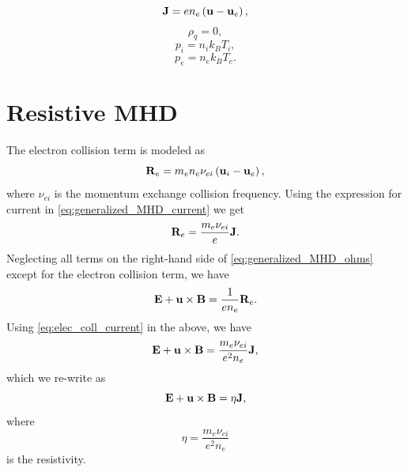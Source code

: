 \documentclass[a4paper,11pt]{report}
\begin{document}
\begin{equation}
    \label{eq:generalized_MHD_current}
    \mathbf{J} = e n_e \left(\mathbf{u} - \mathbf{u}_e \right),
\end{equation}
\begin{equation}
    \label{eq:generalized_MHD_charge}
    \rho_q = 0,
\end{equation}
\begin{equation}
    \label{eq:generalized_MHD_ion_eos}
    p_i = n_i k_B T_i,
\end{equation}
\begin{equation}
    \label{eq:generalized_MHD_elec_eos}
    p_e = n_e k_B T_e.
\end{equation}

\section{Resistive MHD}
The electron collision term is modeled as
\begin{equation}
    \mathbf{R}_e = m_e n_e \nu_{ei} \left ( \mathbf{u}_i - \mathbf{u}_e \right ),
\end{equation}
where $\nu_{ei}$ is the momentum exchange collision frequency. Using the expression for current in \cref{eq:generalized_MHD_current} we get
\begin{equation}
\label{eq:elec_coll_current}
    \mathbf{R}_e = \frac{m_e \nu_{ei}}{e} \mathbf{J}.
\end{equation}
Neglecting all terms on the right-hand side of \cref{eq:generalized_MHD_ohms} except for the electron collision term, we have
\begin{equation}
    \mathbf{E} + \mathbf{u} \times \mathbf{B} = \frac{1}{e n_e} \mathbf{R}_e.
\end{equation}
Using \cref{eq:elec_coll_current} in the above, we have
\begin{equation}
    \mathbf{E} + \mathbf{u} \times \mathbf{B} = \frac{m_e \nu_{ei}}{e^2 n_e} \mathbf{J},
\end{equation}
which we re-write as 
\begin{equation}
    \mathbf{E} + \mathbf{u} \times \mathbf{B} = \eta \mathbf{J},
\end{equation}
where
\begin{equation}
\label{eq:resistivity}
    \eta = \frac{m_e \nu_{ei}}{e^2 n_e}
\end{equation}
is the resistivity.

\end{document}
